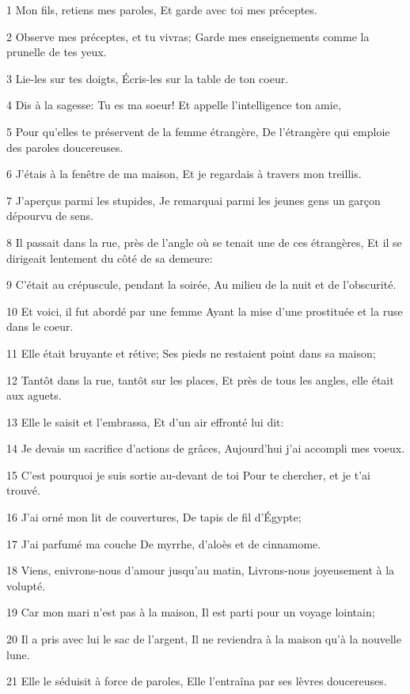 \par 1 Mon fils, retiens mes paroles, Et garde avec toi mes préceptes.
\par 2 Observe mes préceptes, et tu vivras; Garde mes enseignements comme la prunelle de tes yeux.
\par 3 Lie-les sur tes doigts, Écris-les sur la table de ton coeur.
\par 4 Dis à la sagesse: Tu es ma soeur! Et appelle l'intelligence ton amie,
\par 5 Pour qu'elles te préservent de la femme étrangère, De l'étrangère qui emploie des paroles doucereuses.
\par 6 J'étais à la fenêtre de ma maison, Et je regardais à travers mon treillis.
\par 7 J'aperçus parmi les stupides, Je remarquai parmi les jeunes gens un garçon dépourvu de sens.
\par 8 Il passait dans la rue, près de l'angle où se tenait une de ces étrangères, Et il se dirigeait lentement du côté de sa demeure:
\par 9 C'était au crépuscule, pendant la soirée, Au milieu de la nuit et de l'obscurité.
\par 10 Et voici, il fut abordé par une femme Ayant la mise d'une prostituée et la ruse dans le coeur.
\par 11 Elle était bruyante et rétive; Ses pieds ne restaient point dans sa maison;
\par 12 Tantôt dans la rue, tantôt sur les places, Et près de tous les angles, elle était aux aguets.
\par 13 Elle le saisit et l'embrassa, Et d'un air effronté lui dit:
\par 14 Je devais un sacrifice d'actions de grâces, Aujourd'hui j'ai accompli mes voeux.
\par 15 C'est pourquoi je suis sortie au-devant de toi Pour te chercher, et je t'ai trouvé.
\par 16 J'ai orné mon lit de couvertures, De tapis de fil d'Égypte;
\par 17 J'ai parfumé ma couche De myrrhe, d'aloès et de cinnamome.
\par 18 Viens, enivrons-nous d'amour jusqu'au matin, Livrons-nous joyeusement à la volupté.
\par 19 Car mon mari n'est pas à la maison, Il est parti pour un voyage lointain;
\par 20 Il a pris avec lui le sac de l'argent, Il ne reviendra à la maison qu'à la nouvelle lune.
\par 21 Elle le séduisit à force de paroles, Elle l'entraîna par ses lèvres doucereuses.
